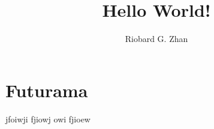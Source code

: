 \documentclass{article}
\author{Riobard G. Zhan}
\title{Hello World!}
\begin{document}
\section{Futurama}

jfoiwji fjiowj owi fjioew 
\end{document}
